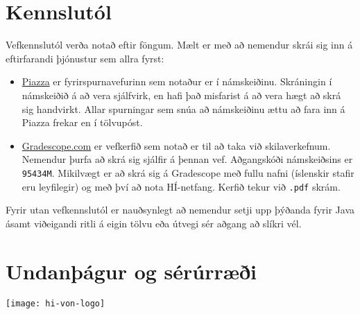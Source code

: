 \documentclass{article}
\begin{document}
\section{Kennslutól}
\label{sec:tools}
Vefkennslutól verða notað eftir föngum. Mælt er með að nemendur skrái sig inn á eftirfarandi þjónustur sem allra fyrst:
\begin{itemize}
 \item \href{https://piazza.com/hi.is/spring2017/tl203g/home}{Piazza} er fyrirspurnavefurinn sem notaður er í námskeiðinu. Skráningin í námskeiðið á að vera sjálfvirk, en hafi það misfarist á að vera hægt að skrá sig handvirkt. Allar spurningar sem snúa að námskeiðinu ættu að fara inn á Piazza frekar en í tölvupóst.
 \item \href{https://gradescope.com/courses/5640}{Gradescope.com} er vefkerfið sem notað er til að taka við skilaverkefnum. Nemendur þurfa að skrá sig sjálfir á þennan vef. Aðgangskóði námskeiðsins er \texttt{95434M}. Mikilvægt er að skrá sig á Gradescope með fullu nafni (íslenskir stafir eru leyfilegir) og með því að nota HÍ-netfang. Kerfið tekur við \texttt{.pdf} skrám.
\end{itemize}
Fyrir utan vefkennslutól er nauðsynlegt að nemendur setji upp þýðanda fyrir Java ásamt viðeigandi ritli á eigin tölvu eða útvegi sér aðgang að slíkri vél.

\section{Undanþágur og sérúrræði}

\vfill
\texttt{[image: hi-von-logo]}
\end{document}
